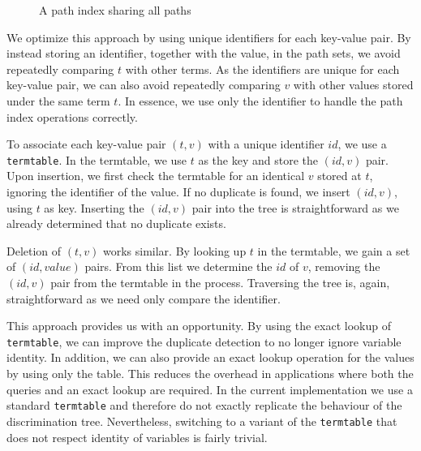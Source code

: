 \begin{figure}[h]
  \centering
{}
  \caption{A path index sharing all paths} \label{ptt_delete}
\end{figure}

We optimize this approach by using unique identifiers for each key-value pair. By instead storing an identifier, together with  the value, in the path sets, we avoid repeatedly comparing $t$ with other terms. As the identifiers are unique for each key-value pair, we can also avoid repeatedly comparing $v$ with other values stored under the same term $t$. In essence, we use only the identifier to handle the path index operations correctly.

To associate each key-value pair $(t,v)$ with a unique identifier $id$, we use a \lstinline{termtable}. In the termtable, we use $t$ as the key and store the $(id,v)$ pair. Upon insertion, we first check the termtable for an identical $v$ stored at $t$, ignoring the identifier of the value. If no duplicate is found, we insert $(id,v)$, using $t$ as key. Inserting the $(id,v)$ pair into the tree is straightforward as we already determined that no duplicate exists.

Deletion of $(t,v)$ works similar. By looking up $t$ in the termtable, we gain a set of $(id,value)$ pairs. From this list we determine the $id$ of $v$, removing the $(id,v)$ pair from the termtable in the process. Traversing the tree is, again, straightforward as we need only compare the identifier.

This approach provides us with an opportunity. By using the exact lookup of \lstinline{termtable}, we can improve the duplicate detection to no longer ignore variable identity. In addition, we can also provide an exact lookup operation for the values by using only the table. This reduces the overhead in applications where both the queries and an exact lookup are required. In the current implementation we use a standard \lstinline{termtable} and therefore do not exactly replicate the behaviour of the discrimination tree. Nevertheless, switching to a variant of the \lstinline{termtable} that does not respect identity of variables is fairly trivial.

